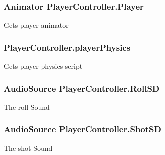 \hypertarget{classPlayerController_af6d2c371d77ff294a3840e6e26608e24}{
\subsubsection[{Player}]{\setlength{\rightskip}{0pt plus 5cm}Animator Player\-Controller.\-Player}}\label{classPlayerController_af6d2c371d77ff294a3840e6e26608e24}


Gets player animator 

\hypertarget{classPlayerController_a039e255582f5fb656710b996fce4667e}{
\subsubsection[{player\-Physics}]{ Player\-Controller.\-player\-Physics}}\label{classPlayerController_a039e255582f5fb656710b996fce4667e}


Gets player physics script 

\hypertarget{classPlayerController_a205f3898c18c6338d4e12f33222d90f5}{
\subsubsection[{Roll\-S\-D}]{\setlength{\rightskip}{0pt plus 5cm}Audio\-Source Player\-Controller.\-Roll\-S\-D}}\label{classPlayerController_a205f3898c18c6338d4e12f33222d90f5}


The roll Sound 

\hypertarget{classPlayerController_aa985596607cf22753896610372c00fa7}{
\subsubsection[{Shot\-S\-D}]{\setlength{\rightskip}{0pt plus 5cm}Audio\-Source Player\-Controller.\-Shot\-S\-D}}\label{classPlayerController_aa985596607cf22753896610372c00fa7}


The shot Sound 

